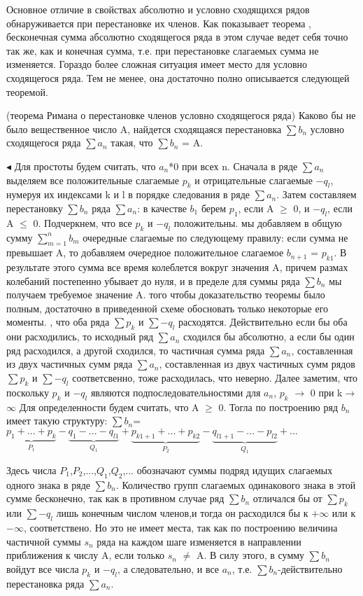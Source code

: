 \par Основное отличие в свойствах абсолютно и условно сходящихся рядов обнаруживается при перестановке их членов. Как показывает теорема , бесконечная сумма абсолютно сходящегося ряда в этом случае ведет себя точно так же, как и конечная сумма, т.е. при перестановке слагаемых сумма не изменяется. Гораздо более сложная ситуация имеет место для условно сходящегося ряда. Тем не менее, она достаточно полно описывается следующей теоремой.
\begin{theorem} 
(теорема Римана о перестановке членов условно сходящегося ряда) Каково бы не было вещественное число A, найдется сходящаяся перестановка $\sum b_n$ условно сходящегося ряда $\sum a_n$ такая, что $\sum b_n$ = A.
\end{theorem}
$\blacktriangleleft$
Для простоты будем считать, что $a_n$*0 при всех n. Сначала в ряде $\sum a_n$ выделяем все положительные слагаемые $p_k$ и отрицательные слагаемые $-q_l$, нумеруя их индексами k и l в порядке следования в ряде $\sum a_n$. Затем составляем перестановку $\sum b_n$ ряда $\sum a_n$: в качестве $b_1$ берем $p_1$, если A $\ge$ 0, и $-q_l$, если A $\leq$ 0. Подчеркнем, что все $p_k$ и $-q_l$ положительны.
 мы добавляем в общую сумму $\sum_{m=1}^n b_m$ очередные слагаемые по следующему правилу: если сумма не превышает A, то добавляем очередное положительное слагаемое $b_{n+1}$ = $p_{k1}$. В результате этого сумма все время колеблется вокруг значения A, причем размах колебаний постепенно убывает до нуля, и в пределе для суммы ряда $\sum b_n$ мы получаем требуемое значение A.
 того чтобы доказательство теоремы было полным, достаточно в приведенной схеме обосновать только некоторые его моменты.
, что оба ряда $\sum p_k$ и $\sum-q_l$ расходятся. Действительно если бы оба они расходились, то исходный ряд $\sum a_n$ сходился бы абсолютно, а если бы один ряд расходился, а другой сходился, то частичная сумма ряда $\sum a_n$, составленная из двух частичных сумм ряда $\sum a_n$, составленная из двух частичных сумм рядов $\sum p_k$ и $\sum-q_l$ соответсвенно, тоже расходилась, что неверно. Далее заметим, что поскольку ${p_k}$ и ${-q_l}$ являются подпоследовательностями для ${a_n}$, $p_k$ $\rightarrow$ 0 при k$\rightarrow$ $\infty$
Для определенности будем считать, что A $\ge$ 0. Тогла по построению ряд $b_n$ имеет такую структуру:
$\sum b_n$= $\underbrace{p_1+...+p_{k}}_{\text{$P_1$}}-\underbrace{q_1-...-q_{l1}}_{\text{$Q_1$}}+ \underbrace{p_{k1+1}+...+p_{k2}}_{\text{$P_2$}}-\underbrace{q_{l1+1}-...-p_{l2}}_{\text{$Q_1$}}+...$
\par Здесь числа $P_1$,$P_2$,...,$Q_1$,$Q_2$,... обозначают суммы подряд идущих слагаемых одного знака в ряде $\sum b_n$. Количество групп слагаемых одинакового знака в этой сумме бесконечно, так как в противном случае ряд $\sum b_n$ отличался бы от $\sum p_k$ или $\sum-q_l$ лишь конечным числом членов,и тогда он расходился бы к $+\infty$ или к $-\infty$, соответствено. Но это не имеет места, так как по построению величина частичной суммы $s_n$ ряда на каждом шаге изменяется в направлении приближения к числу A, если только $s_n$ $\ne$ A. В силу этого, в сумму $\sum b_n$ войдут все числа $p_k$ и $-q_l$, а следовательно, и все $a_n$, т.е. $\sum b_n$-действительно перестановка ряда $\sum a_n$.
